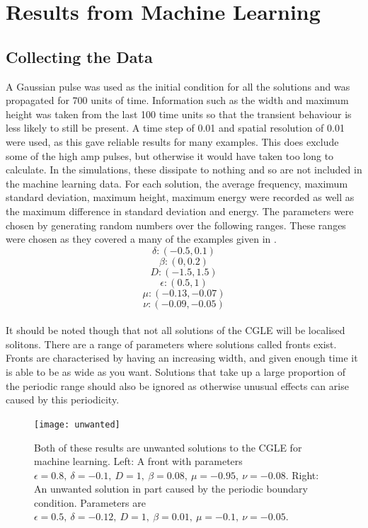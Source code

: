 \documentclass[a4paper,12pt]{report}
\begin{document}








\chapter{Results from Machine Learning}
\section{Collecting the Data}
A Gaussian pulse was used as the initial condition for all the solutions and was propagated for 700 units of time. Information such as the width and maximum height was taken from the last 100 time units so that the transient behaviour is less likely to still be present. A time step of 0.01 and spatial resolution of 0.01 were used, as this gave reliable results for many examples. This does exclude some of the high amp pulses, but otherwise it would have taken too long to calculate. In the simulations, these dissipate to nothing and so are not included in the machine learning data. For each solution, the average frequency, maximum standard deviation, maximum height, maximum energy were recorded as well as the maximum difference in standard deviation and energy. The parameters were chosen by generating random numbers over the following ranges. These ranges were chosen as they covered a many of the examples given in \cite{2001}. 
$$\delta: (-0.5,0.1)$$
$$\beta: (0,0.2)$$
$$D: (-1.5,1.5)$$
$$\epsilon: (0.5,1)$$
$$\mu: (-0.13,-0.07)$$
$$\nu: (-0.09,-0.05)$$
\\
It should be noted though that not all solutions of the CGLE will be localised solitons. There are a range of parameters where solutions called fronts exist. Fronts are characterised by having an increasing width, and given enough time it is able to be as wide as you want. \cite{2001}
Solutions that take up a large proportion of the periodic range should also be ignored as otherwise unusual effects can arise caused by this periodicity. 
\begin{figure}[h]
\centering
\texttt{[image: unwanted]}
\caption{Both of these results are unwanted solutions to the CGLE for machine learning. Left: A front with parameters $\epsilon=0.8,\ \delta=-0.1,\ D=1, \ \beta=0.08, \ \mu=-0.95,\ \nu=-0.08$. Right: An unwanted solution in part caused by the periodic boundary condition. Parameters are $\epsilon=0.5,\ \delta=-0.12,\ D=1, \ \beta=0.01, \ \mu=-0.1,\ \nu=-0.05$. }
\label{unwanted} 
\end{figure} 
\end{document}

